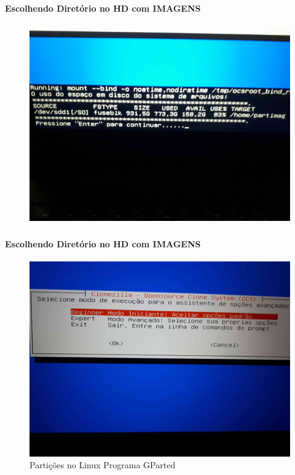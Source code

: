 \documentclass{beamer}
\begin{document}
\begin{frame}[plain,c]
   \frametitle{\insertsection}
    \framesubtitle{Escolhendo Diretório no HD com IMAGENS}
    \begin{figure}[!h]
        \includegraphics[width=1\linewidth]{images/rest/res2.jpg}
    \end{figure}
\end{frame}


\begin{frame}[plain,c]
   \frametitle{\insertsection}
    \framesubtitle{Escolhendo Diretório no HD com IMAGENS}
    \begin{figure}[!h]
        \includegraphics[width=1\linewidth]{images/rest/res3.jpg}
        \caption{Partições no Linux Programa GParted}
    \end{figure}
\end{frame}
\end{document}
